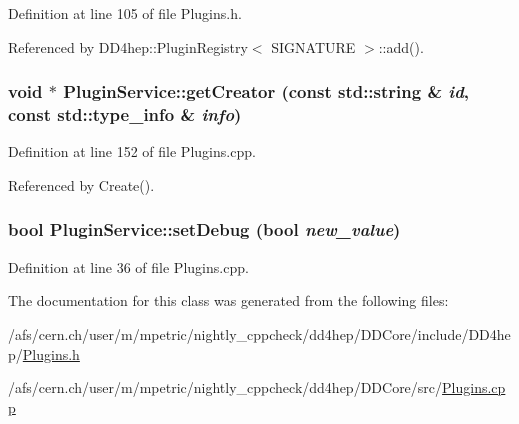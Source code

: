 Definition at line 105 of file Plugins.h.

Referenced by DD4hep::PluginRegistry$<$ SIGNATURE $>$::add().\hypertarget{class_d_d4hep_1_1_plugin_service_a63fcd240235468c6408563b0057c82df}{
\subsubsection[{getCreator}]{\setlength{\rightskip}{0pt plus 5cm}void $\ast$ PluginService::getCreator (const std::string \& {\em id}, \/  const std::type\_\-info \& {\em info})}}
\label{class_d_d4hep_1_1_plugin_service_a63fcd240235468c6408563b0057c82df}


Definition at line 152 of file Plugins.cpp.

Referenced by Create().\hypertarget{class_d_d4hep_1_1_plugin_service_a54147a8801746a0304f8b6c63aa0e083}{
\subsubsection[{setDebug}]{\setlength{\rightskip}{0pt plus 5cm}bool PluginService::setDebug (bool {\em new\_\-value})}}
\label{class_d_d4hep_1_1_plugin_service_a54147a8801746a0304f8b6c63aa0e083}


Definition at line 36 of file Plugins.cpp.

The documentation for this class was generated from the following files:\begin{DoxyCompactItemize}
\item 
/afs/cern.ch/user/m/mpetric/nightly\_\-cppcheck/dd4hep/DDCore/include/DD4hep/\hyperlink{_plugins_8h}{Plugins.h}\item 
/afs/cern.ch/user/m/mpetric/nightly\_\-cppcheck/dd4hep/DDCore/src/\hyperlink{_plugins_8cpp}{Plugins.cpp}\end{DoxyCompactItemize}
